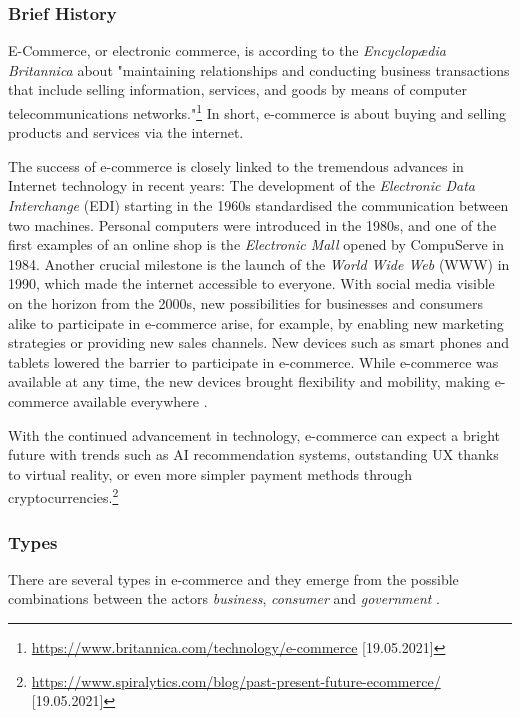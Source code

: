 \subsubsection{Brief History}

E-Commerce, or electronic commerce, is according to the \textit{Encyclopædia Britannica} about "maintaining relationships and conducting business transactions that include selling information, services, and goods by means of computer telecommunications networks."\footnote{\url{https://www.britannica.com/technology/e-commerce} [19.05.2021]}
In short, e-commerce is about buying and selling products and services via the internet.


The success of e-commerce is closely linked to the tremendous advances in Internet technology in recent years:
The development of the \textit{Electronic Data Interchange} (EDI) starting in the 1960s standardised the communication between two machines.
Personal computers were introduced in the 1980s, and one of the first examples of an online shop is the \textit{Electronic Mall} opened by CompuServe in 1984.
Another crucial milestone is the launch of the \textit{World Wide Web} (WWW) in 1990, which made the internet accessible to everyone.
With social media visible on the horizon from the 2000s, new possibilities for businesses and consumers alike to participate in e-commerce arise, for example, by enabling new marketing strategies or providing new sales channels.
New devices such as smart phones and tablets lowered the barrier to participate in e-commerce.
While e-commerce was available at any time, the new devices brought flexibility and mobility, making e-commerce available everywhere \cite{2019Hermogeno}.

With the continued advancement in technology, e-commerce can expect a bright future with trends such as AI recommendation systems, outstanding UX thanks to virtual reality, or even more simpler payment methods through cryptocurrencies.\footnote{\url{https://www.spiralytics.com/blog/past-present-future-ecommerce/} [19.05.2021]}



\subsubsection{Types}

There are several types in e-commerce and they emerge from the possible combinations between the actors \textit{business}, \textit{consumer} and \textit{government} \cite{2017DosSantos}.

